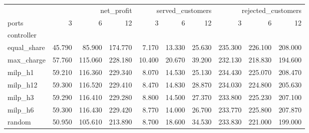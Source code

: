 \begin{tabular}{lrrrrrrrrr}
\toprule
 & \multicolumn{3}{r}{net_profit} & \multicolumn{3}{r}{served_customers} & \multicolumn{3}{r}{rejected_customers} \\
ports & 3 & 6 & 12 & 3 & 6 & 12 & 3 & 6 & 12 \\
controller &  &  &  &  &  &  &  &  &  \\
\midrule
equal_share & 45.790 & 85.900 & 174.770 & 7.170 & 13.330 & 25.630 & 235.300 & 226.100 & 208.000 \\
max_charge & 57.760 & 115.060 & 228.180 & 10.400 & 20.670 & 39.200 & 232.130 & 218.830 & 194.600 \\
milp_h1 & 59.210 & 116.360 & 229.340 & 8.070 & 14.530 & 25.130 & 234.430 & 225.070 & 208.470 \\
milp_h12 & 59.300 & 116.520 & 229.410 & 8.470 & 14.830 & 28.870 & 234.030 & 224.800 & 205.630 \\
milp_h3 & 59.290 & 116.410 & 229.280 & 8.800 & 14.500 & 27.370 & 233.800 & 225.230 & 207.100 \\
milp_h6 & 59.300 & 116.430 & 229.420 & 8.770 & 14.000 & 26.700 & 233.770 & 225.800 & 207.870 \\
random & 50.950 & 105.610 & 213.890 & 8.700 & 18.600 & 34.530 & 233.830 & 221.000 & 199.000 \\
\bottomrule
\end{tabular}
